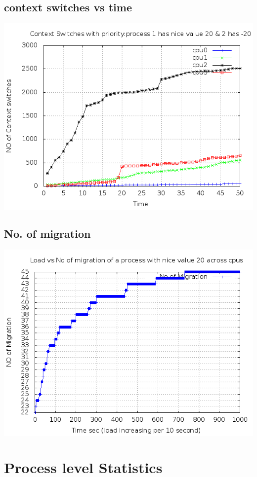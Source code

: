 \documentclass[a4paper,11pt]{report}
\begin{document}
 \subsection{context switches vs time}
 \includegraphics[scale=0.6]{priosched.png}
 \subsection{No. of migration}
  \includegraphics[scale=0.6]{miglow.png}
 \section{Process level Statistics}
\end{document}
